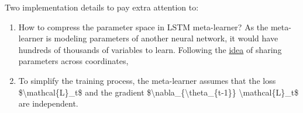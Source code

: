 Two implementation details to pay extra attention to:

\begin{enumerate}
\tightlist
\item
  How to compress the parameter space in LSTM meta-learner? As the meta-learner is modeling parameters of another neural network, it would have hundreds of thousands of variables to learn. Following the \href{https://arxiv.org/abs/1606.04474}{idea} of sharing parameters across coordinates,
\item
  To simplify the training process, the meta-learner assumes that the loss \$\textbackslash mathcal\{L\}\_t\$ and the gradient \$\textbackslash nabla\_\{\textbackslash theta\_\{t-1\}\} \textbackslash mathcal\{L\}\_t\$ are independent.
\end{enumerate}

